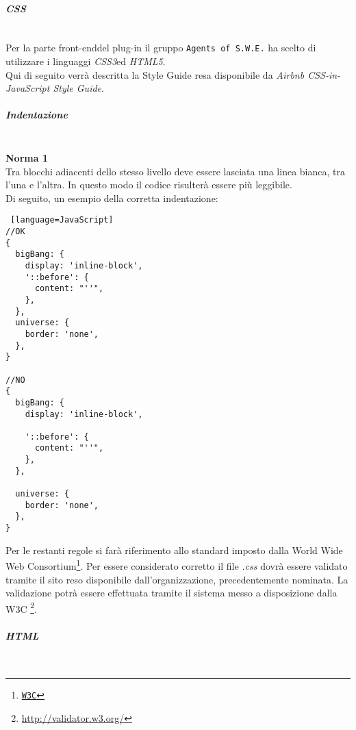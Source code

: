 \paragraph{\textit{CSS}}
\label{css} \-\\
Per la parte front-end\glossario del plug-in il gruppo \texttt{Agents of S.W.E.} ha scelto di utilizzare i linguaggi \textit{CSS3}\glossario ed \textit{HTML5}\glossario.\\
Qui di seguito verrà descritta la Style Guide resa disponibile da \textit{Airbnb CSS-in-JavaScript Style Guide}.

\subparagraph{Indentazione} \-\\
\textbf{Norma 1}\\
Tra blocchi adiacenti dello stesso livello deve essere lasciata una linea bianca, tra l'una e l'altra. In questo modo il codice risulterà essere più leggibile. \\
Di seguito, un esempio della corretta indentazione: 


\begin{lstlisting} [language=JavaScript]
//OK
{
  bigBang: {
    display: 'inline-block',
    '::before': {
      content: "''",
    },
  },
  universe: {
    border: 'none',
  },
}

//NO
{
  bigBang: {
    display: 'inline-block',

    '::before': {
      content: "''",
    },
  },

  universe: {
    border: 'none',
  },
}
\end{lstlisting}

Per le restanti regole si farà riferimento allo standard imposto dalla World Wide Web Consortium\footnote{\href{http://www.w3.org/}{\texttt{W3C}}}. Per essere considerato corretto il file \textit{.css} dovrà essere validato tramite il sito reso disponibile dall'organizzazione, precedentemente nominata. La validazione potrà essere effettuata tramite il sistema messo a disposizione dalla W3C \footnote{\url{http://validator.w3.org/}}.

\paragraph{\textit{HTML}}
\label{html}\-\\

